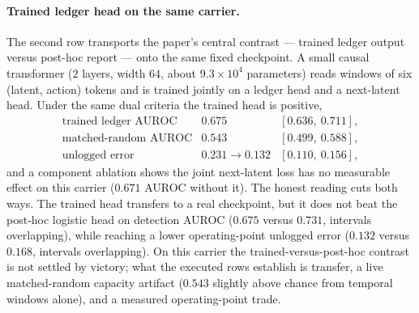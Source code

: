 \paragraph{Trained ledger head on the same carrier.}
The second row transports the paper's central contrast --- trained ledger
output versus post-hoc report --- onto the same fixed checkpoint.  A small
causal transformer ($2$ layers, width $64$, about $9.3\times 10^{4}$
parameters) reads windows of six (latent, action) tokens and is trained
jointly on a ledger head and a next-latent head.  Under the same dual
criteria the trained head is positive,
$$
\begin{array}{lll}
\text{trained ledger AUROC} & 0.675 & [0.636,\ 0.711],\\
\text{matched-random AUROC} & 0.543 & [0.499,\ 0.588],\\
\text{unlogged error} & 0.231 \rightarrow 0.132 & [0.110,\ 0.156],
\end{array}
$$
and a component ablation shows the joint next-latent loss has no measurable
effect on this carrier ($0.671$ AUROC without it).  The honest reading cuts
both ways.  The trained head transfers to a real checkpoint, but it does not
beat the post-hoc logistic head on detection AUROC ($0.675$ versus $0.731$,
intervals overlapping), while reaching a lower operating-point unlogged error
($0.132$ versus $0.168$, intervals overlapping).  On this carrier the
trained-versus-post-hoc contrast is not settled by victory; what the executed
rows establish is transfer, a live matched-random capacity artifact ($0.543$
slightly above chance from temporal windows alone), and a measured
operating-point trade.

